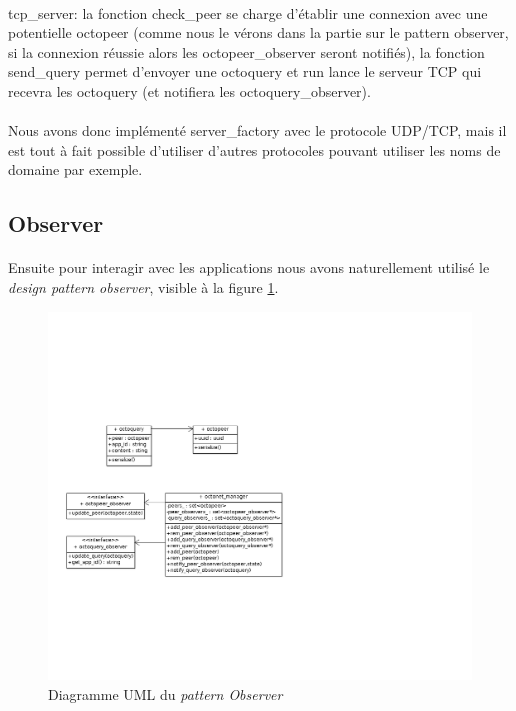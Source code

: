 \documentclass[a4paper]{article}
\begin{document}
			\paragraph{}{
			tcp\_server: la fonction check\_peer se charge d’établir une connexion avec une potentielle octopeer
			(comme nous le vérons dans la partie sur le pattern observer, si la connexion réussie alors les
			octopeer\_observer seront notifiés), la fonction send\_query permet d’envoyer une octoquery et 
			run lance le serveur TCP qui recevra les octoquery (et notifiera les octoquery\_observer).
			}
			
			\paragraph{}{
			Nous avons donc implémenté server\_factory avec le protocole UDP/TCP, mais il est tout à fait 
			possible d’utiliser d’autres protocoles pouvant utiliser les noms de domaine par exemple.
			}

		\subsection{Observer}
		
			\paragraph{}{
			Ensuite pour interagir avec les applications nous avons naturellement utilisé le \textit{design pattern observer},
			visible à la figure \ref{observer_uml}.
			}

			\begin{figure}[!h]
				\centering
				\includegraphics[scale=0.65]{UML/octonet_observer1.png}
				\caption{\label{observer_uml} Diagramme UML du \textit{pattern Observer}}
			\end{figure}
			
\end{document}

